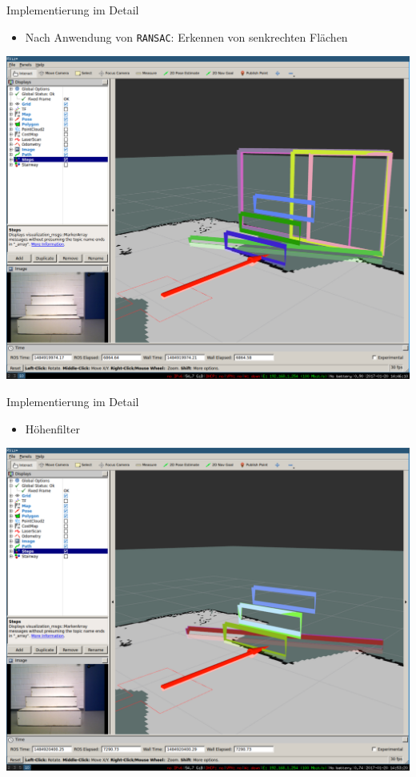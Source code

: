 \documentclass[18pt]{beamer}
\begin{document}
\begin{frame}{Implementierung im Detail}
	\begin{itemize}
		\item Nach Anwendung von \texttt{RANSAC}: Erkennen von senkrechten Flächen
	\end{itemize}
	\begin{center}
		\includegraphics[scale=0.16]{images/ransac01.pdf}
	\end{center}
\end{frame}

\begin{frame}{Implementierung im Detail}
	\begin{itemize}
		\item Höhenfilter
	\end{itemize}
	\begin{center}
		\includegraphics[scale=0.16]{images/ransac02.pdf}
	\end{center}
\end{frame}
\end{document}
